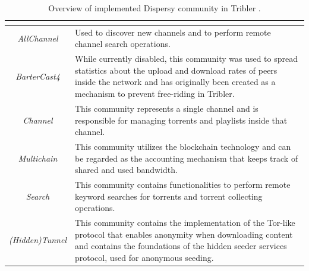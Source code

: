 \begin{table}[tbp]
	\centering
	\caption{Overview of implemented Dispersy community in Tribler \cite{2016:tribler-techdebt:vos}.}
	\label{tbl:community}
	\begin{tabular}{|c|p{11cm}|}
		\hline
		\rowcolor[HTML]{EFEFEF} 
		\multicolumn{1}{|c|}{\cellcolor[HTML]{EFEFEF}{\color[HTML]{333333} \textbf{Community Name}}} & \multicolumn{1}{c|}{\cellcolor[HTML]{EFEFEF}{\color[HTML]{333333} \textbf{Purpose}}}                                                                                                                                     \\ \hline
		\textit{AllChannel}                                                                          & Used to discover new channels and to perform remote channel search operations.                                                                                                                                           \\ \hline
		\textit{BarterCast4}\cite{2009:bartercast:meulpolder}                                                                         & While currently disabled, this community was used to spread statistics about the upload and download rates of peers inside the network and has originally been created as a mechanism to prevent free-riding in Tribler. \\ \hline
		\textit{Channel}                                                                             & This community represents a single channel and is responsible for managing torrents and playlists inside that channel.                                                                                                   \\ \hline
		\textit{Multichain}          \cite{2015:multichain:norberhuis}                                                                & This community utilizes the blockchain technology and can be regarded as the accounting mechanism that keeps track of shared and used bandwidth.                                                                         \\ \hline
		\textit{Search}                                                                              & This community contains functionalities to perform remote keyword searches for torrents and torrent collecting operations.                                                                                               \\ \hline
		\textit{(Hidden)Tunnel}                                                                      & This community contains the implementation of the Tor-like protocol that enables anonymity when downloading content and contains the foundations of the hidden seeder services protocol, used for anonymous seeding.     \\ \hline
	\end{tabular}
\end{table}

